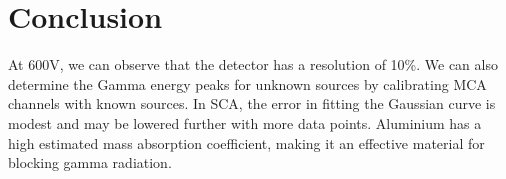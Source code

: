 \section{Conclusion}
	At 600V, we can observe that the detector has a resolution of 10\%. We can also determine the Gamma energy peaks for unknown sources by calibrating MCA channels with known sources. In SCA, the error in fitting the Gaussian curve is modest and may be lowered further with more data points. Aluminium has a high estimated mass absorption coefficient, making it an effective material for blocking gamma radiation.

